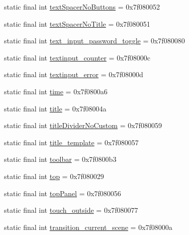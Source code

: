 \begin{CompactItemize}
\item 
static final int \hyperlink{classandroid_1_1support_1_1v7_1_1cardview_1_1_r_1_1id_710d277acb5956a80c0e424266229560}{textSpacerNoButtons} = 0x7f080052
\item 
static final int \hyperlink{classandroid_1_1support_1_1v7_1_1cardview_1_1_r_1_1id_3964f2bbd277fa7ccd4d6e3ea1ef02f0}{textSpacerNoTitle} = 0x7f080051
\item 
static final int \hyperlink{classandroid_1_1support_1_1v7_1_1cardview_1_1_r_1_1id_934f6a6aec3847faf984eed683c2d786}{text\_\-input\_\-password\_\-toggle} = 0x7f080080
\item 
static final int \hyperlink{classandroid_1_1support_1_1v7_1_1cardview_1_1_r_1_1id_760ccaca921cb7a3ec8dabd0e5790a8a}{textinput\_\-counter} = 0x7f08000c
\item 
static final int \hyperlink{classandroid_1_1support_1_1v7_1_1cardview_1_1_r_1_1id_33ceb8fed34ae02b0d9111fc46a0b0eb}{textinput\_\-error} = 0x7f08000d
\item 
static final int \hyperlink{classandroid_1_1support_1_1v7_1_1cardview_1_1_r_1_1id_82a02bed40ec6040ba9e69be3187086f}{time} = 0x7f0800a6
\item 
static final int \hyperlink{classandroid_1_1support_1_1v7_1_1cardview_1_1_r_1_1id_aa85420bbca31795935008f8223f50c9}{title} = 0x7f08004a
\item 
static final int \hyperlink{classandroid_1_1support_1_1v7_1_1cardview_1_1_r_1_1id_dca895c9529bffa40411a9ec7b0e6db0}{titleDividerNoCustom} = 0x7f080059
\item 
static final int \hyperlink{classandroid_1_1support_1_1v7_1_1cardview_1_1_r_1_1id_ea88edabbbcc745f8bf943ed1f4366cf}{title\_\-template} = 0x7f080057
\item 
static final int \hyperlink{classandroid_1_1support_1_1v7_1_1cardview_1_1_r_1_1id_0af1df872d043bb0fea6440a75f2bb14}{toolbar} = 0x7f0800b3
\item 
static final int \hyperlink{classandroid_1_1support_1_1v7_1_1cardview_1_1_r_1_1id_82eac350d37ba40f066bca4ac995c64e}{top} = 0x7f080029
\item 
static final int \hyperlink{classandroid_1_1support_1_1v7_1_1cardview_1_1_r_1_1id_68f3d5ffc90e48245981104c01ffadd7}{topPanel} = 0x7f080056
\item 
static final int \hyperlink{classandroid_1_1support_1_1v7_1_1cardview_1_1_r_1_1id_482b251e69df624925e4966a6cab2e58}{touch\_\-outside} = 0x7f080077
\item 
static final int \hyperlink{classandroid_1_1support_1_1v7_1_1cardview_1_1_r_1_1id_2815ca5eed7084a27e7beeac982a983c}{transition\_\-current\_\-scene} = 0x7f08000a

\end{CompactItemize}
